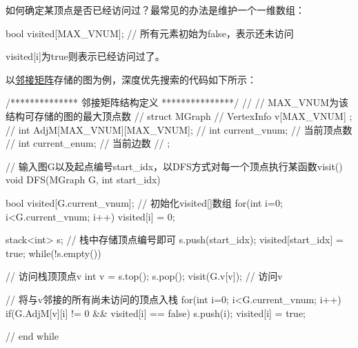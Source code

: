 如何确定某顶点是否已经访问过？最常见的办法是维护一个一维数组：
\begin{cppcode}
    bool visited[MAX_VNUM]; // 所有元素初始为false，表示还未访问
\end{cppcode}
visited[i]为true则表示已经访问过了。

以\uline{邻接矩阵}存储的图为例，深度优先搜索的代码如下所示：
\begin{cppcode}
/************** 邻接矩阵结构定义 ***************/
// // MAX_VNUM为该结构可存储的图的最大顶点数
//     struct MGraph { 
//         VertexInfo v[MAX_VNUM] ;
//         int AdjM[MAX_VNUM][MAX_VNUM];
//         int current_vnum;   // 当前顶点数
//         int current_enum;   // 当前边数
//     };

// 输入图G以及起点编号start_idx，以DFS方式对每一个顶点执行某函数visit()
void DFS(MGraph G, int start_idx) {
    bool visited[G.current_vnum];
    // 初始化visited[]数组
    for(int i=0; i<G.current_vnum; i++) {
        visited[i] = 0;
    }

    stack<int> s;   // 栈中存储顶点编号即可
    s.push(start_idx);
    visited[start_idx] = true;
    while(!s.empty()) {
        // 访问栈顶顶点v
        int v = s.top();
        s.pop();
        visit(G.v[v]);   // 访问v
        
        // 将与v邻接的所有尚未访问的顶点入栈
        for(int i=0; i<G.current_vnum; i++) {
            if(G.AdjM[v][i] != 0 && visited[i] == false) {
                s.push(i);
                visited[i] = true;
            }
        }
    } // end while
}
\end{cppcode}


